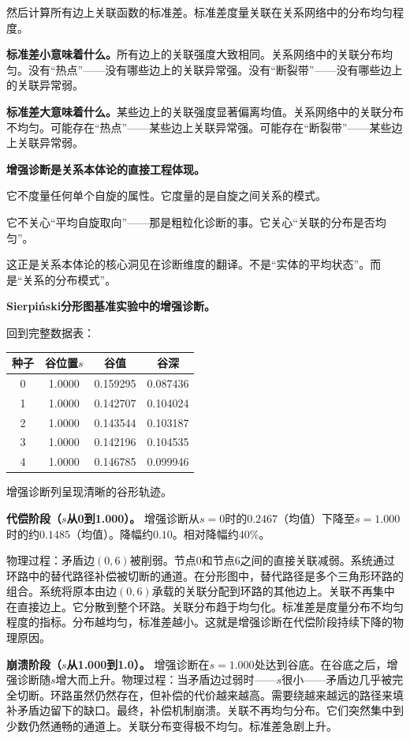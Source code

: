 \documentclass[11pt,a4paper]{book}
\theoremstyle{definition}
\begin{document}
然后计算所有边上关联函数的标准差。标准差度量关联在关系网络中的分布均匀程度。

\textbf{标准差小意味着什么。}所有边上的关联强度大致相同。关系网络中的关联分布均匀。没有“热点”——没有哪些边上的关联异常强。没有“断裂带”——没有哪些边上的关联异常弱。

\textbf{标准差大意味着什么。}某些边上的关联强度显著偏离均值。关系网络中的关联分布不均匀。可能存在“热点”——某些边上关联异常强。可能存在“断裂带”——某些边上关联异常弱。

\textbf{增强诊断是关系本体论的直接工程体现。}

它不度量任何单个自旋的属性。它度量的是自旋之间关系的模式。

它不关心“平均自旋取向”——那是粗粒化诊断的事。它关心“关联的分布是否均匀”。

这正是关系本体论的核心洞见在诊断维度的翻译。不是“实体的平均状态”。而是“关系的分布模式”。

\textbf{Sierpiński分形图基准实验中的增强诊断。}

回到完整数据表：

\begin{table}[h]
\centering
\begin{tabular}{cccc}
\toprule
种子 & 谷位置$s$ & 谷值 & 谷深 \\
\midrule
0 & 1.0000 & 0.159295 & 0.087436 \\
1 & 1.0000 & 0.142707 & 0.104024 \\
2 & 1.0000 & 0.143544 & 0.103187 \\
3 & 1.0000 & 0.142196 & 0.104535 \\
4 & 1.0000 & 0.146785 & 0.099946 \\
\bottomrule
\end{tabular}
\end{table}

增强诊断列呈现清晰的谷形轨迹。

\textbf{代偿阶段（$s$从0到1.000）。} 增强诊断从$s=0$时的$0.2467$（均值）下降至$s=1.000$时的约$0.1485$（均值）。降幅约$0.10$。相对降幅约$40\%$。

物理过程：矛盾边$(0,6)$被削弱。节点0和节点6之间的直接关联减弱。系统通过环路中的替代路径补偿被切断的通道。在分形图中，替代路径是多个三角形环路的组合。系统将原本由边$(0,6)$承载的关联分配到环路的其他边上。关联不再集中在直接边上。它分散到整个环路。关联分布趋于均匀化。标准差是度量分布不均匀程度的指标。分布越均匀，标准差越小。这就是增强诊断在代偿阶段持续下降的物理原因。

\textbf{崩溃阶段（$s$从1.000到1.0）。} 增强诊断在$s=1.000$处达到谷底。在谷底之后，增强诊断随$s$增大而上升。物理过程：当矛盾边过弱时——$s$很小——矛盾边几乎被完全切断。环路虽然仍然存在，但补偿的代价越来越高。需要绕越来越远的路径来填补矛盾边留下的缺口。最终，补偿机制崩溃。关联不再均匀分布。它们突然集中到少数仍然通畅的通道上。关联分布变得极不均匀。标准差急剧上升。
\end{document}
